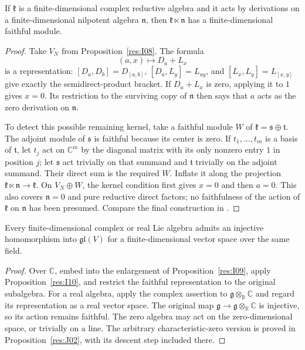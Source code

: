 \begin{proposition}\label{res:I10}
If \(\mathfrak k\) is a finite-dimensional complex reductive algebra
and it acts by derivations on a finite-dimensional nilpotent
algebra \(\mathfrak n\), then \(\mathfrak k\ltimes\mathfrak n\)
has a finite-dimensional faithful module.
\end{proposition}
\begin{proof}
Take \(V_N\) from Proposition~\ref{res:I08}. The formula
\[
 (a,x)\longmapsto D_a+L_x
\]
is a representation: \([D_a,D_b]=D_{[a,b]}\),
\([D_a,L_y]=L_{a y}\), and \([L_x,L_y]=L_{[x,y]}\)
give exactly the semidirect-product bracket.
If \(D_a+L_x\) is zero, applying it to \(1\) gives \(x=0\).
Its restriction to the surviving copy of \(\mathfrak n\)
then says that \(a\) acts as the zero derivation on \(\mathfrak n\).

To detect this possible remaining kernel, take a faithful module
\(W\) of \(\mathfrak k=\mathfrak s\oplus\mathfrak t\).
The adjoint module of \(\mathfrak s\) is faithful because its center
is zero. If \(t_1,\ldots,t_m\) is a basis of \(\mathfrak t\),
let \(t_j\) act on \(\mathbb C^m\) by the diagonal matrix with
its only nonzero entry \(1\) in position \(j\); let \(\mathfrak s\)
act trivially on that summand and \(\mathfrak t\) trivially on
the adjoint summand. Their direct sum is the required \(W\).
Inflate it along the projection
\(\mathfrak k\ltimes\mathfrak n\to\mathfrak k\).
On \(V_N\oplus W\), the kernel condition first gives \(x=0\)
and then \(a=0\). This also covers \(\mathfrak n=0\) and pure
reductive direct factors; no faithfulness of the action of
\(\mathfrak k\) on \(\mathfrak n\) has been presumed.
Compare the final construction in \cite[Theorem 50.8]{etingof}.
\end{proof}

\begin{theorem}\label{res:I11}
Every finite-dimensional complex or real Lie algebra admits an
injective homomorphism into \(\mathfrak{gl}(V)\) for a
finite-dimensional vector space over the same field.
\end{theorem}
\begin{proof}
Over \(\mathbb C\), embed into the enlargement of
Proposition~\ref{res:I09}, apply Proposition~\ref{res:I10},
and restrict the faithful representation to the original subalgebra.
For a real algebra, apply the complex assertion to
\(\mathfrak g\otimes_{\mathbb R}\mathbb C\) and regard its
representation as a real vector space. The original map
\(\mathfrak g\to\mathfrak g\otimes_{\mathbb R}\mathbb C\)
is injective, so its action remains faithful. The zero algebra
may act on the zero-dimensional space, or trivially on a line.
The arbitrary characteristic-zero version is proved in
Proposition~\ref{res:J02}, with its descent step included there.
\end{proof}
